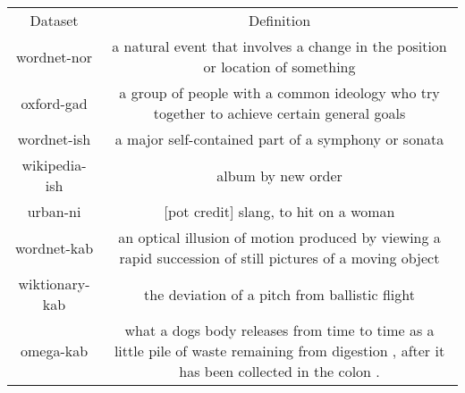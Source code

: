 \begin{tabular}{cc}
Dataset & Definition\\
wordnet-nor & a natural event that involves a change in the position or location of something\\
oxford-gad & a group of people with a common ideology who try together to achieve certain general goals\\
wordnet-ish & a major self-contained part of a symphony or sonata\\
wikipedia-ish & album by new order\\
urban-ni & [pot credit] slang, to hit on a woman\\
wordnet-kab & an optical illusion of motion produced by viewing a rapid succession of still pictures of a moving object\\
wiktionary-kab & the deviation of a pitch from ballistic flight\\
omega-kab & what a dogs body releases from time to time as a little pile of waste remaining from digestion , after it has been collected in the colon .\\
\end{tabular}
